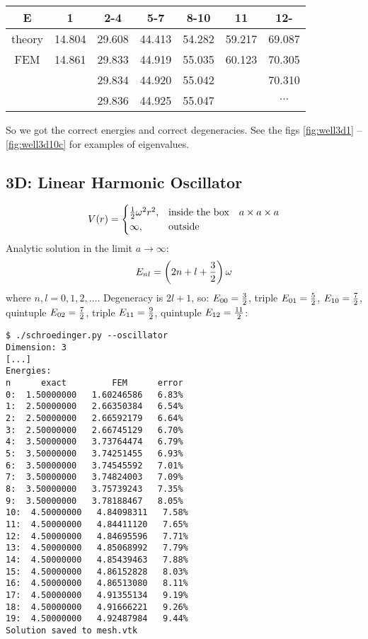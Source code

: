 \begin{tabular}{ c | c c c c c c }
E      & 1 & 2-4 & 5-7 & 8-10 & 11 & 12- \\
\hline
theory & 14.804 & 29.608 & 44.413 & 54.282 & 59.217 & 69.087 \\
FEM    & 14.861 & 29.833 & 44.919 & 55.035 & 60.123 & 70.305 \\
       &        & 29.834 & 44.920 & 55.042 &        & 70.310 \\
       &        & 29.836 & 44.925 & 55.047 &        & $\cdots$ \\
\end{tabular}

So we got the correct energies and correct degeneracies. See the figs
\ref{fig:well3d1} -- \ref{fig:well3d10c} for examples of eigenvalues.




\subsection{3D: Linear Harmonic Oscillator}

$$V(r)=\begin{cases}{\textstyle{1\over2}}\omega^2r^2,&\text{inside the box}\quad a\times a\times a \\
\infty, & \text{outside}\end{cases}$$
Analytic solution in the limit $a\to\infty$:
$$E_{nl}=\left(2n+l+{3\over2}\right)\omega$$
where $n, l = 0, 1, 2, \dots$.
Degeneracy is $2l+1$, so:
$E_{00} = {3\over2}$,
triple $E_{01} = {5\over2}$,
$E_{10} = {7\over2}$,
quintuple $E_{02} = {7\over2}$,
triple $E_{11} = {9\over2}$,
quintuple $E_{12} = {11\over2}$:

\begin{lstlisting}
$ ./schroedinger.py --oscillator
Dimension: 3
[...]
Energies:
n      exact         FEM      error
0:  1.50000000   1.60246586   6.83%
1:  2.50000000   2.66350384   6.54%
2:  2.50000000   2.66592179   6.64%
3:  2.50000000   2.66745129   6.70%
4:  3.50000000   3.73764474   6.79%
5:  3.50000000   3.74251455   6.93%
6:  3.50000000   3.74545592   7.01%
7:  3.50000000   3.74824003   7.09%
8:  3.50000000   3.75739243   7.35%
9:  3.50000000   3.78188467   8.05%
10:  4.50000000   4.84098311   7.58%
11:  4.50000000   4.84411120   7.65%
12:  4.50000000   4.84695596   7.71%
13:  4.50000000   4.85068992   7.79%
14:  4.50000000   4.85439463   7.88%
15:  4.50000000   4.86152828   8.03%
16:  4.50000000   4.86513080   8.11%
17:  4.50000000   4.91355134   9.19%
18:  4.50000000   4.91666221   9.26%
19:  4.50000000   4.92487984   9.44%
Solution saved to mesh.vtk
\end{lstlisting}

